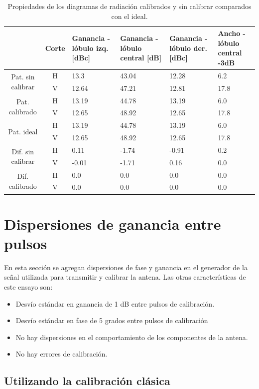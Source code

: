 \begin{table}[H]
  \footnotesize
  \centering
  \begin{tabular}{|c|c|p{2cm}|p{2.5cm}|p{2.5cm}|p{2.5cm}|}
    \cline{2-6}
    \multicolumn{1}{c|}{} & Corte & Ganancia - lóbulo izq. [dBc] & Ganancia - lóbulo central [dB] &
    Ganancia - lóbulo der. [dBc] & Ancho - lóbulo central -3dB \tabularnewline\hline
    \multirow{2}{2cm}{Pat. sin calibrar} & H & 13.3 & 43.04 & 12.28 & 6.2 \tabularnewline\cline{2-6}
     & V & 12.64 & 47.21 & 12.81 & 17.8 \tabularnewline\hline
    \multirow{2}{2cm}{Pat. calibrado} & H & 13.19 & 44.78 & 13.19 & 6.0 \tabularnewline\cline{2-6}
     & V & 12.65 & 48.92 & 12.65 & 17.8 \tabularnewline\hline
    \multirow{2}{2cm}{Pat. ideal} & H & 13.19 & 44.78 & 13.19 & 6.0 \tabularnewline\cline{2-6}
     & V & 12.65 & 48.92 & 12.65 & 17.8 \tabularnewline\hline
    \multirow{2}{2cm}{Dif. sin calibrar} & H & 0.11 & -1.74 & -0.91 & 0.2\tabularnewline\cline{2-6}
     & V & -0.01 & -1.71 & 0.16 & 0.0 \tabularnewline\hline
    \multirow{2}{2cm}{Dif. calibrado} & H & 0.0 & 0.0 & 0.0 & 0.0 \tabularnewline\cline{2-6}
     & V & 0.0 & 0.0 & 0.0 & 0.0 \tabularnewline\hline
  \end{tabular}
  \caption{Propiedades de los diagramas de radiación calibrados y sin calibrar comparados con el ideal.}
  \label{tab:compErrMutual10degRow}
\end{table}


\section{Dispersiones de ganancia entre pulsos}

En esta sección se agregan dispersiones de fase y ganancia en el generador de la señal utilizada para transmitir y calibrar 
la antena. Las otras características de este ensayo son:
\begin{itemize}
	\item Desvío estándar en ganancia de 1 dB entre pulsos de calibración.
	\item Desvío estándar en fase de 5 grados entre pulsos de calibración
	\item No hay dispersiones en el comportamiento de los componentes de la antena.
	\item No hay errores de calibración.
\end{itemize}

\subsection{Utilizando la calibración clásica}

